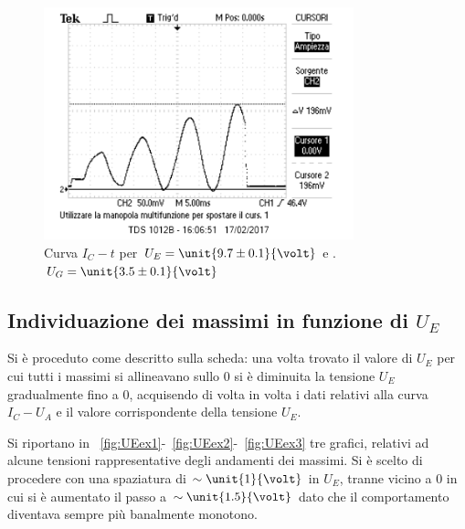 \documentclass[10pt,a4paper]{article}
\begin{document}
\begin{figure}[h!]
	\centering
	\includegraphics[width=0.80\textwidth]{../oscilloscopio/Task6_3.png}
	\caption{Curva $I_{C} - t$ per $U_{E}=\unit{9.7 \pm 0.1}{\volt}$ e .$U_{G}=\unit{3.5 \pm 0.1}{\volt}$}
	\label{task6.3}
\end{figure}


\subsection{Individuazione dei massimi in funzione di $U_E$}

Si è proceduto come descritto sulla scheda: una volta trovato il valore di $U_E$ per cui tutti i massimi si allineavano sullo 0 si è diminuita la tensione $U_E$ gradualmente fino a 0, acquisendo di volta in volta i dati relativi alla curva $I_{C} - U_{A}$ e il valore corrispondente della tensione $U_E$.

Si riportano in \figurename{~\ref{fig:UEex1}-~\ref{fig:UEex2}-~\ref{fig:UEex3}} tre grafici, relativi ad alcune tensioni rappresentative degli andamenti dei massimi.
Si è scelto di procedere con una spaziatura di $\sim \unit{1}{\volt}$ in $U_E$, tranne vicino a 0 in cui si è aumentato il passo a $\sim \unit{1.5}{\volt}$ dato che il comportamento diventava sempre più banalmente monotono.
\end{document}

